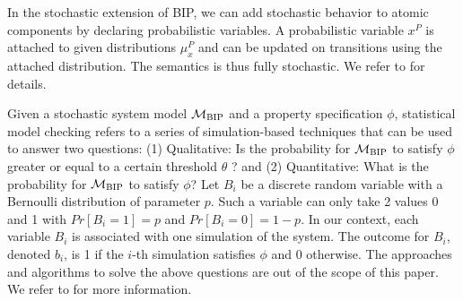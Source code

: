In the stochastic extension of BIP, we can add stochastic behavior to atomic components by declaring probabilistic variables.
 A probabilistic variable $x^{P}$ is attached to given distributions $\mu_{x}^{P}$ and can be updated on transitions using the attached distribution.
 The semantics is thus fully stochastic.
 We refer to \cite{sbip18} for details.
 
Given a stochastic system model $\mathcal{M}_{\textsc{BIP}}$ and a property specification $\phi$, 
 statistical model checking refers to a series of simulation-based techniques 
 that can be used to answer two questions: 
 (1) Qualitative: Is the probability for $\mathcal{M}_{\textsc{BIP}}$ to satisfy $\phi$ greater or equal to a certain threshold $\theta$ ? and 
 (2) Quantitative: What is the probability for $\mathcal{M}_{\textsc{BIP}}$ to satisfy $\phi$?
 Let $B_i$ be a discrete random variable with a Bernoulli distribution of parameter $p$. 
 Such a variable can only take 2 values 0 and 1 with $Pr[B_i = 1] = p$ and $Pr[B_i = 0] = 1-p$.
 In our context, each variable $B_i$ is associated with one simulation of the system. 
 The outcome for $B_i$,  denoted $b_i$, is 1 if the $i$-th simulation satisfies $\phi$ and 0 otherwise.
 The approaches and algorithms to solve the above questions are out of the scope of this paper.
 We refer to \cite{smc-past} for more information.